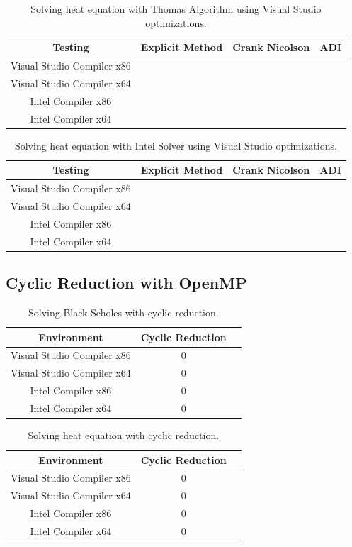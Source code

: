 \documentclass[12pt, oneside]{book}
\theoremstyle{plain}
\theoremstyle{definition}
\begin{document}
\begin{table}[htp!]
\centering
 \begin{tabular}{||c c c c||} 
 \hline
 Testing & Explicit Method & Crank Nicolson & ADI\\ [0.5ex] 
 \hline\hline\hline
 Visual Studio Compiler x86 \\ 
 Visual Studio Compiler x64 & \\
 Intel Compiler x86 & \\
 Intel Compiler x64 & \\[1ex] 
 \hline
 \end{tabular}
 \caption{Solving heat equation with Thomas Algorithm using Visual Studio optimizations.}
\end{table}
 
 
\begin{table}[htp!]
\centering
 \begin{tabular}{||c c c c||} 
 \hline
 Testing & Explicit Method & Crank Nicolson & ADI\\ [0.5ex] 
 \hline\hline\hline
 Visual Studio Compiler x86 \\ 
 Visual Studio Compiler x64 & \\
 Intel Compiler x86 & \\
 Intel Compiler x64 & \\[1ex] 
 \hline
 \end{tabular}
 \caption{Solving heat equation with Intel Solver using Visual Studio optimizations.}
\end{table}

\subsection{Cyclic Reduction with OpenMP} 
 
\begin{table}[h!]
\centering
 \begin{tabular}{||c c c||} 
 \hline
 Environment & Cyclic Reduction\\ [0.5ex] 
 \hline\hline\hline
 Visual Studio Compiler x86 & 0\\ 
 Visual Studio Compiler x64 & 0 \\
 Intel Compiler x86 & 0\\
 Intel Compiler x64 &0 \\ [1ex] 
 \hline
 \end{tabular}
 \caption{Solving Black-Scholes with cyclic reduction.}
\end{table}

\begin{table}[h!]
\centering
 \begin{tabular}{||c c c||} 
 \hline
 Environment & Cyclic Reduction\\ [0.5ex] 
 \hline\hline\hline
 Visual Studio Compiler x86 & 0\\ 
 Visual Studio Compiler x64 & 0 \\
 Intel Compiler x86 & 0\\
 Intel Compiler x64 &0 \\ [1ex] 
 \hline
 \end{tabular}
 \caption{Solving heat equation with cyclic reduction.}
\end{table}
\end{document}
